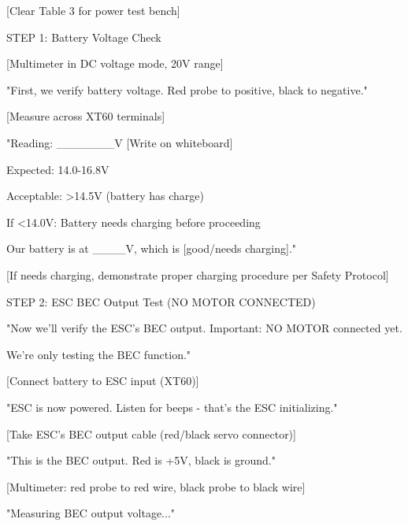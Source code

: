 \documentclass[11pt,letterpaper]{article}
\begin{document}
{[Clear Table 3 for power test bench]\par

STEP 1: Battery Voltage Check\par

[Multimeter in DC voltage mode, 20V range]\par

"First, we verify battery voltage. Red probe to positive, black to negative."\par

[Measure across XT60 terminals]\par

"Reading: \_\_\_\_\_\_\_V [Write on whiteboard]\par

Expected: 14.0-16.8V\par

Acceptable: >14.5V (battery has charge)\par

If <14.0V: Battery needs charging before proceeding\par

Our battery is at \_\_\_\_V, which is [good/needs charging]."\par

[If needs charging, demonstrate proper charging procedure per Safety Protocol]\par

STEP 2: ESC BEC Output Test (NO MOTOR CONNECTED)\par

"Now we'll verify the ESC's BEC output. Important: NO MOTOR connected yet.\par

We're only testing the BEC function."\par

[Connect battery to ESC input (XT60)]\par

"ESC is now powered. Listen for beeps - that's the ESC initializing."\par

[Take ESC's BEC output cable (red/black servo connector)]\par

"This is the BEC output. Red is +5V, black is ground."\par

[Multimeter: red probe to red wire, black probe to black wire]\par

"Measuring BEC output voltage..."\par

}
\end{document}
